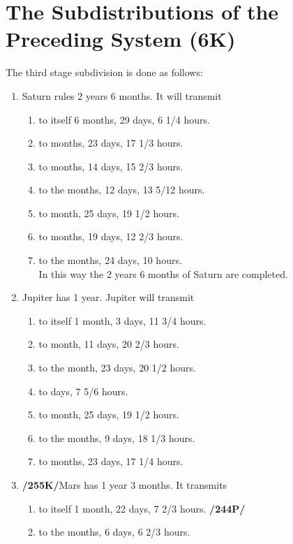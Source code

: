\section{The Subdistributions of the Preceding System (6K)}

The third stage subdivision is done as follows:

\begin{enumerate}[label=\Roman*]
\item Saturn rules 2 years 6 months. It will transmit
	\begin{enumerate}
		\item to itself 6 months, 29 days, 6 1/4 hours.
		\item to \Jupiter\xspace 2 months, 23 days, 17 1/3 hours.
		\item to \Mars\xspace 3 months, 14 days, 15 2/3 hours.
		\item to the \Sun\xspace 4 months, 12 days, 13 5/12 hours.
		\item to \Venus\xspace 1 month, 25 days, 19 1/2 hours.
		\item to \Mercury\xspace 4 months, 19 days, 12 2/3 hours.
		\item to the \Moon\xspace 5 months, 24 days, 10 hours. \\
		  In this way the 2 years 6 months of Saturn are completed.
	\end{enumerate}
\item Jupiter has 1 year. Jupiter will transmit
	\begin{enumerate}
	\item to itself 1 month, 3 days, 11 3/4 hours.
	\item to \Mars\xspace 1 month, 11 days, 20 2/3 hours.
	\item to the \Sun\xspace 1 month, 23 days, 20 1/2 hours.
	\item to \Venus\xspace 22 days, 7 5/6 hours.
	\item to \Mercury\xspace 1 month, 25 days, 19 1/2 hours.
	\item to the \Moon\xspace 2 months, 9 days, 18 1/3 hours.
	\item to \Saturn\xspace 2 months, 23 days, 17 1/4 hours.
	\end{enumerate}
\item \textbf{/255K/}Mars has 1 year 3 months. It transmits
	\begin{enumerate}
	\item to itself 1 month, 22 days, 7 2/3 hours. \textbf{/244P/}
	\item to the \Sun\xspace 2 months, 6 days, 6 2/3 hours.

\end{enumerate}
\end{enumerate}
